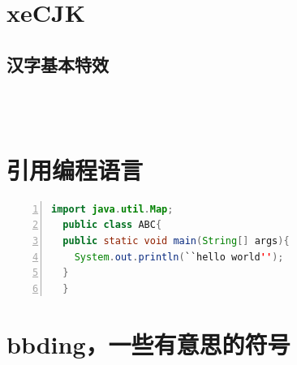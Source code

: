 \documentclass[a4paper,12pt]{article} %
\begin{document}
\section{xeCJK}
\subsection{汉字基本特效}
\\
\\


\section{引用编程语言}
\begin{lstlisting}[language=Java,firstline=2,lastline=5,numbers=left,numberstyle=\large,stepnumber=2,numbersep=10pt]
  import java.util.Map;
  public class ABC{
  public static void main(String[] args){
    System.out.println(``hello world'');
  }
  }
\end{lstlisting}
  
\section{bbding，一些有意思的符号}
\begin{Huge}
\HandRight \HandLeft \XSolid \Plus \Cross \CrossClowerTips \\
\CrossMaltese \FiveStar \FiveStarLines \SixStar \EightStar \TwelweStar \\
\SixteenStarLight \FiveFlowerOpen \FiveFlowerPetal \Snowflake \SnowflakeChevron \Sparkle \\
\SquareSolid \Square \TriangleUp \TriangleDown \OrnamentDiamondSolid \Ellipse \\
\Phone \Tape \Plane \Envelope \Peace \Checkmark \\
\end{Huge}
\end{document}
